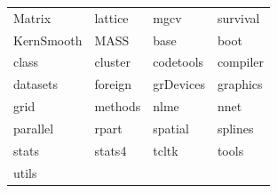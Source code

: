 \begin{tabular}{llll} 
Matrix & lattice & mgcv & survival\\ 
KernSmooth & MASS & base & boot\\ 
class & cluster & codetools & compiler\\ 
datasets & foreign & grDevices & graphics\\ 
grid & methods & nlme & nnet\\ 
parallel & rpart & spatial & splines\\ 
stats & stats4 & tcltk & tools\\ 
utils  &   &   \\ 
\end{tabular}
